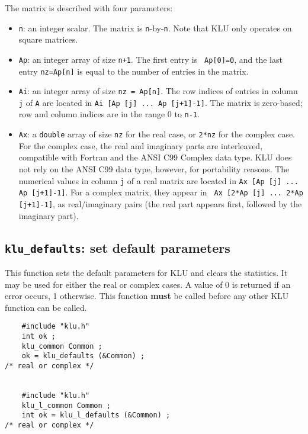 \documentclass[11pt]{article}
\begin{document}
The matrix is described with four parameters:

\begin{itemize}
\item {\tt n}: an integer scalar.  The matrix is {\tt n}-by-{\tt n}.  Note that
KLU only operates on square matrices.

\item {\tt Ap}: an integer array of size {\tt n+1}.  The first entry is {\tt
Ap[0]=0}, and the last entry {\tt nz=Ap[n]} is equal to the number of entries
in the matrix.

\item {\tt Ai}: an integer array of size {\tt nz = Ap[n]}.
The row indices of entries in column {\tt j} of {\tt A} are located in
{\tt Ai [Ap [j] ... Ap [j+1]-1]}.  The matrix is zero-based; row and column
indices are in the range 0 to {\tt n-1}.

\item {\tt Ax}: a {\tt double} array of size {\tt nz} for the real case, or
{\tt 2*nz} for the complex case.  For the complex case, the real and imaginary
parts are interleaved, compatible with Fortran and the ANSI C99 Complex data
type.  KLU does not rely on the ANSI C99 data type, however, for portability
reasons.  The numerical values in column {\tt j} of a real matrix are located
in {\tt Ax [Ap [j] ... Ap [j+1]-1]}.  For a complex matrix, they appear in {\tt
Ax [2*Ap [j] ... 2*Ap [j+1]-1]}, as real/imaginary pairs (the real part appears
first, followed by the imaginary part).

\end{itemize}

\subsection{{\tt klu\_defaults}: set default parameters}

This function sets the default parameters for KLU and clears the statistics.
It may be used for either the real or complex cases.  A value of 0 is returned
if an error occurs, 1 otherwise.  This function {\bf must} be called before
any other KLU function can be called.

{\footnotesize
\begin{verbatim}
    #include "klu.h"
    int ok ;
    klu_common Common ;
    ok = klu_defaults (&Common) ;                                             /* real or complex */


    #include "klu.h"
    klu_l_common Common ;
    int ok = klu_l_defaults (&Common) ;                                       /* real or complex */
\end{verbatim}
}
\end{document}
